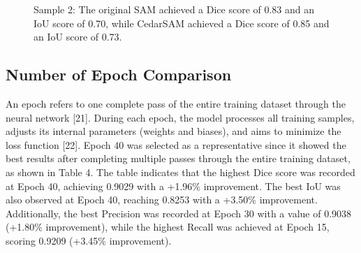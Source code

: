 \documentclass[letterpaper, 10 pt, conference]{ieeeconf}  %
\begin{document}
\begin{figure}[thpb]
  \centering
  \caption{Sample 2: The original SAM achieved a Dice score of 0.83 and an IoU score of 0.70, while CedarSAM achieved a Dice score of 0.85 and an IoU score of 0.73.}
  \label{fig:score_distributions}
\end{figure}

\subsection{Number of Epoch Comparison}
An epoch refers to one complete pass of the entire training dataset through the neural network [21]. During each epoch, the model processes all training samples, adjusts its internal parameters (weights and biases), and aims to minimize the loss function [22]. Epoch 40 was selected as a representative since it showed the best results after completing multiple passes through the entire training dataset, as shown in Table 4. The table indicates that the highest Dice score was recorded at Epoch 40, achieving 0.9029 with a +1.96\% improvement. The best IoU was also observed at Epoch 40, reaching 0.8253 with a +3.50\% improvement. Additionally, the best Precision was recorded at Epoch 30 with a value of 0.9038 (+1.80\% improvement), while the highest Recall was achieved at Epoch 15, scoring 0.9209 (+3.45\% improvement).
\end{document}
